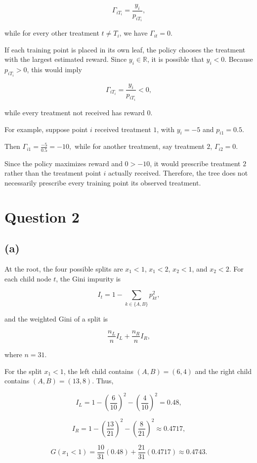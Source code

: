 \documentclass{article}
\begin{document}
$$
\Gamma_{iT_i}
=
\frac{y_i}{p_{iT_i}},
$$

while for every other treatment $t\neq T_i$, we have $
\Gamma_{it}=0.
$

If each training point is placed in its own leaf, the policy chooses the treatment with the largest estimated reward. Since $y_i\in\mathbb{R}$, it is possible that $y_i<0$. Because $p_{iT_i}>0$, this would imply

$$
\Gamma_{iT_i}
=
\frac{y_i}{p_{iT_i}}
<0,
$$

while every treatment not received has reward $0$.

For example, suppose point $i$ received treatment $1$, with $
y_i=-5
$ and $
p_{i1}=0.5.
$ 

Then $
\Gamma_{i1}
=
\frac{-5}{0.5}
=
-10,
$ while for another treatment, say treatment $2$, $
\Gamma_{i2}=0.
$ 

Since the policy maximizes reward and $0>-10$, it would prescribe treatment $2$ rather than the treatment point $i$ actually received. Therefore, the tree does not necessarily prescribe every training point its observed treatment.



\newpage

\section*{Question 2}


\subsection*{(a)}

At the root, the four possible splits are $x_1<1$, $x_1<2$, $x_2<1$, and $x_2<2$. For each child node $t$, the Gini impurity is

$$
I_t=1-\sum_{k\in\{A,B\}}p_{kt}^2,
$$

and the weighted Gini of a split is

$$
\frac{n_L}{n}I_L+\frac{n_R}{n}I_R,
$$

where $n=31$.

For the split $x_1<1$, the left child contains $(A,B)=(6,4)$ and the right child contains $(A,B)=(13,8)$. Thus,

$$
I_L
=
1-\left(\frac{6}{10}\right)^2-\left(\frac{4}{10}\right)^2
=
0.48,
$$

$$
I_R
=
1-\left(\frac{13}{21}\right)^2-\left(\frac{8}{21}\right)^2
\approx
0.4717,
$$

$$
G(x_1<1)
=
\frac{10}{31}(0.48)
+
\frac{21}{31}(0.4717)
\approx
0.4743.
$$
\end{document}
